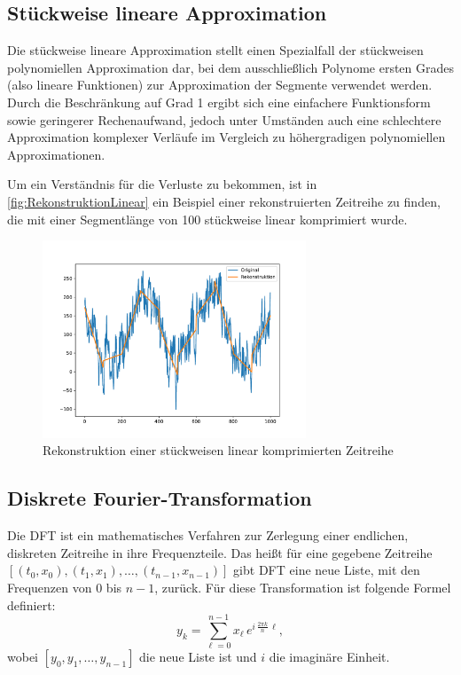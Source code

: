 \subsection{Stückweise lineare Approximation}
Die stückweise lineare Approximation stellt einen Spezialfall der stückweisen polynomiellen Approximation dar, bei dem ausschließlich Polynome ersten Grades (also lineare Funktionen) zur Approximation der Segmente verwendet werden.
Durch die Beschränkung auf Grad 1 ergibt sich eine einfachere Funktionsform sowie geringerer Rechenaufwand, jedoch unter Umständen auch eine schlechtere Approximation komplexer Verläufe im Vergleich zu höhergradigen polynomiellen Approximationen.

Um ein Verständnis für die Verluste zu bekommen, ist in \autoref{fig:RekonstruktionLinear} ein Beispiel einer rekonstruierten Zeitreihe zu finden, die mit einer Segmentlänge von 100 stückweise linear komprimiert wurde.
\begin{figure}[bth] 
  \centering
  \includegraphics[width=0.7\textwidth]{Graphics/RekonstruktionLinear.pdf}
  \caption{Rekonstruktion einer stückweisen linear komprimierten Zeitreihe}
  \label{fig:RekonstruktionLinear}
\end{figure}

\subsection{Diskrete Fourier-Transformation}
Die \ac{DFT} ist ein mathematisches Verfahren zur Zerlegung einer endlichen, diskreten Zeitreihe in ihre Frequenzteile. Das heißt für eine gegebene Zeitreihe $[(t_0,x_0),(t_1,x_1),\ldots,(t_{n-1},x_{n-1})]$ gibt \acs{DFT} eine neue Liste, mit den Frequenzen von 0 bis $n-1$, zurück. Für diese Transformation ist folgende Formel definiert:
\[y_k=\sum_{\ell=0}^{n-1}x_\ell\,e^{i\,\tfrac{2\pi k}{n}\,\ell},\]
wobei $[y_0,y_1,\ldots,y_{n-1}]$ die neue Liste ist und $i$ die imaginäre Einheit.

